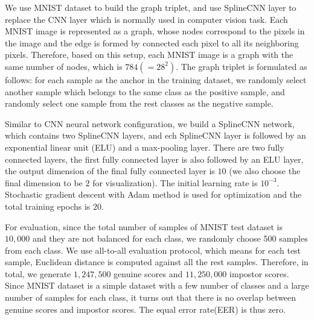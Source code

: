 We use MNIST dataset \cite{LecunIEEE1998} to build the graph triplet, and use SplineCNN layer \cite{FeyCVPR2018splinecnn} \cite{FeyICLR2020DGMC} to replace the CNN layer which is normally used in computer vision task. Each MNIST image is represented as a graph, whose nodes correspond to the pixels in the image and the edge is formed by connected each pixel to all its neighboring pixels. Therefore, based on this setup, each MNIST image is a graph with the same number of nodes, which is $784(=28^2)$. The graph triplet is formulated as follows: for each sample as the anchor in the training dataset, we randomly select another sample which belongs to the same class as the positive sample, and randomly select one sample from the rest classes as the negative sample. 

Similar to CNN neural network configuration, we build a SplineCNN network, which contains two SplineCNN layers, and ech SplineCNN layer is followed by an exponential linear unit (ELU) and a max-pooling layer. There are two fully connected layers, the first fully connected layer is also followed by an ELU layer, the output dimension of the final fully connected layer is $10$ (we also choose the final dimension to be $2$ for visualization). The initial learning rate is $10^{-3}$. Stochastic gradient descent with Adam method is used for optimization and the total training epochs is $20$.

For evaluation, since the total number of samples of MNIST test dataset is $10,000$ and they are not balanced for each class, we randomly choose 500 samples from each class. We use all-to-all evaluation protocol, which means for each test sample, Euclidean distance is computed against all the rest samples. Therefore, in total, we generate $1,247,500$ genuine scores and $11,250,000$ impostor scores. Since MNIST dataset is a simple dataset with a few number of classes and a large number of samples for each class, it turns out that there is no overlap between genuine scores and impostor scores. The equal error rate(EER) is thus zero.

